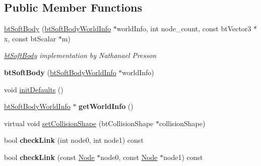 \subsection*{Public Member Functions}
\begin{DoxyCompactItemize}
\item 
\hypertarget{classbt_soft_body_a842480e0f75b82a50f0e5e606e2ac40b}{\hyperlink{classbt_soft_body_a842480e0f75b82a50f0e5e606e2ac40b}{bt\+Soft\+Body} (\hyperlink{structbt_soft_body_world_info}{bt\+Soft\+Body\+World\+Info} $\ast$world\+Info, int node\+\_\+count, const bt\+Vector3 $\ast$x, const bt\+Scalar $\ast$m)}\label{classbt_soft_body_a842480e0f75b82a50f0e5e606e2ac40b}

\begin{DoxyCompactList}\small\item\em \hyperlink{classbt_soft_body}{bt\+Soft\+Body} implementation by Nathanael Presson \end{DoxyCompactList}\item 
\hypertarget{classbt_soft_body_a63dc6650741946528320f46770e20519}{{\bfseries bt\+Soft\+Body} (\hyperlink{structbt_soft_body_world_info}{bt\+Soft\+Body\+World\+Info} $\ast$world\+Info)}\label{classbt_soft_body_a63dc6650741946528320f46770e20519}

\item 
void \hyperlink{classbt_soft_body_ae07c09d9c2937897c3690c1a3970bf61}{init\+Defaults} ()
\item 
\hypertarget{classbt_soft_body_a306c96275bd2811b98ec5f9f3849e6f6}{\hyperlink{structbt_soft_body_world_info}{bt\+Soft\+Body\+World\+Info} $\ast$ {\bfseries get\+World\+Info} ()}\label{classbt_soft_body_a306c96275bd2811b98ec5f9f3849e6f6}

\item 
virtual void \hyperlink{classbt_soft_body_aced0f5421eeb1491a3fd77bb91e2e5af}{set\+Collision\+Shape} (bt\+Collision\+Shape $\ast$collision\+Shape)
\item 
\hypertarget{classbt_soft_body_a709f4801dc0963cc780d53bb005aba8c}{bool {\bfseries check\+Link} (int node0, int node1) const }\label{classbt_soft_body_a709f4801dc0963cc780d53bb005aba8c}

\item 
\hypertarget{classbt_soft_body_a96d6c58efa61a72ef77b78a6c644a12e}{bool {\bfseries check\+Link} (const \hyperlink{structbt_soft_body_1_1_node}{Node} $\ast$node0, const \hyperlink{structbt_soft_body_1_1_node}{Node} $\ast$node1) const }\label{classbt_soft_body_a96d6c58efa61a72ef77b78a6c644a12e}


\end{DoxyCompactItemize}
